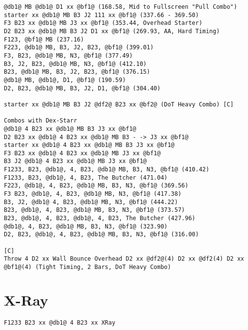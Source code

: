 \documentclass[main.tex]{subfiles}
\begin{document}
\begin{lstlisting}[language=FG]
@db1@ MB @db1@ D1 xx @bf1@ (168.58, Mid to Fullscreen "Pull Combo")
starter xx @db1@ MB B3 J2 111 xx @bf1@ (337.66 - 369.50)
F3 B23 xx @db1@ MB J3 xx @bf1@ (353.44, Overhead Starter)
D2 B23 xx @db1@ MB B3 J2 D1 xx @bf1@ (269.93, AA, Hard Timing)
F123, @bf1@ MB (237.16)
F223, @db1@ MB, B3, J2, B23, @bf1@ (399.01)
F3, B23, @db1@ MB, N3, @bf1@ (377.49)
B3, J2, B23, @db1@ MB, N3, @bf1@ (412.10)
B23, @db1@ MB, B3, J2, B23, @bf1@ (376.15)
@db1@ MB, @db1@, D1, @bf1@ (190.59)
D2, B23, @db1@ MB, B3, J2, D1, @bf1@ (304.40)

starter xx @db1@ MB B3 J2 @df2@ B23 xx @bf2@ (DoT Heavy Combo) [C]

Combos with Dex-Starr
@db1@ 4 B23 xx @db1@ MB B3 J3 xx @bf1@ 
D2 B23 xx @db1@ 4 B23 xx @db1@ MB B3 - -> J3 xx @bf1@
starter xx @db1@ 4 B23 xx @db1@ MB B3 J3 xx @bf1@
F3 B23 xx @db1@ 4 B23 xx @db1@ MB J3 xx @bf1@
B3 J2 @db1@ 4 B23 xx @db1@ MB J3 xx @bf1@ 
F1233, B23, @db1@, 4, B23, @db1@ MB, B3, N3, @bf1@ (410.42)
F1233, B23, @db1@, 4, B23, The Butcher (471.04)
F223, @db1@, 4, B23, @db1@ MB, B3, N3, @bf1@ (369.56)
F3 B23, @db1@, 4, B23, @db1@ MB, N3, @bf1@ (417.38)
B3, J2, @db1@ 4, B23, @db1@ MB, N3, @bf1@ (444.22)
B23, @db1@, 4, B23, @db1@ MB, B3, N3, @bf1@ (373.57)
B23, @db1@, 4, B23, @db1@, 4, B23, The Butcher (427.96)
@db1@, 4, B23, @db1@ MB, B3, N3, @bf1@ (323.90)
D2, B23, @db1@, 4, B23, @db1@ MB, B3, N3, @bf1@ (316.00)

[C]
Throw 4 D2 xx Wall Bounce Overhead D2 xx @df2@(4) D2 xx @df2(4) D2 xx @bf1@(4) (Tight Timing, 2 Bars, DoT Heavy Combo)
\end{lstlisting}





\section{X-Ray}
\begin{lstlisting}[language=FG]
F1233 B23 xx @db1@ 4 B23 xx XRay
\end{lstlisting}
\end{document}

